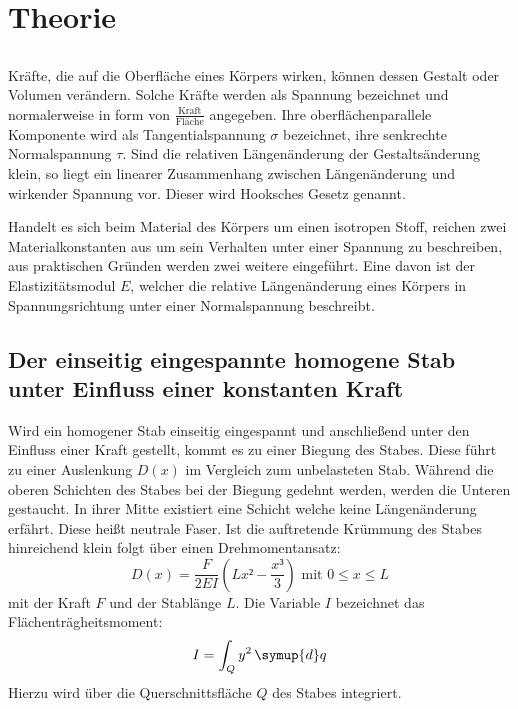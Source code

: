 
\section{Theorie}
\label{sec:Theorie}

\subsection{}
Kräfte, die auf die Oberfläche eines Körpers wirken, können dessen Gestalt oder
 Volumen verändern. Solche Kräfte werden als Spannung bezeichnet und normalerweise
  in form von $\frac{\text{Kraft}}{\text{Fläche}}$ angegeben. Ihre oberflächenparallele
   Komponente wird als Tangentialspannung $\sigma$ bezeichnet, ihre senkrechte Normalspannung $\tau$.
    Sind die relativen Längenänderung der Gestaltsänderung klein, so liegt ein
     linearer Zusammenhang zwischen Längenänderung und wirkender Spannung vor.
      Dieser wird Hooksches Gesetz genannt.

      Handelt es sich beim Material des Körpers um einen isotropen Stoff,
       reichen zwei Materialkonstanten aus um sein Verhalten unter einer Spannung
        zu beschreiben, aus praktischen Gründen werden zwei weitere eingeführt.
         Eine davon ist der Elastizitätsmodul $E$, welcher die
         relative Längenänderung eines Körpers in Spannungsrichtung unter
          einer Normalspannung beschreibt.

\subsection{Der einseitig eingespannte homogene Stab unter Einfluss einer konstanten Kraft}
Wird ein homogener Stab einseitig eingespannt und anschließend unter den Einfluss
 einer Kraft gestellt, kommt es zu einer Biegung des Stabes. Diese führt zu einer
  Auslenkung $D(x)$ im Vergleich zum unbelasteten Stab. Während die oberen
   Schichten des Stabes bei der Biegung gedehnt werden, werden die Unteren gestaucht.
   In ihrer Mitte existiert eine Schicht welche keine Längenänderung erfährt.
   Diese heißt neutrale Faser. Ist die auftretende Krümmung des Stabes
    hinreichend klein folgt über einen Drehmomentansatz:
   \begin{equation}
     D(x) = \frac{F}{2EI}\left(Lx² - \frac{x³}{3}\right) \text{ mit }0 \leq x \leq L
     \end{equation}
     mit der Kraft $F$ und der Stablänge $L$. Die Variable $I$ bezeichnet das
     Flächenträgheitsmoment:
\begin{equation}
  I = \int_{Q}^{}y^2 \, \symup{d}q
\end{equation}
Hierzu wird über die Querschnittsfläche $Q$ des Stabes integriert.

